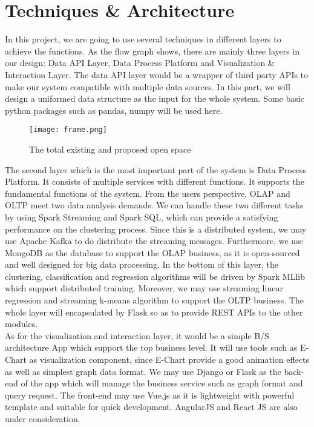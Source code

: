 \documentclass{vgtc}                          %
\begin{document}
\section{Techniques \& Architecture}

\noindent In this project, we are going to use several techniques in different layers to achieve the functions. As the flow graph shows, there are mainly three layers in our design: Data API Layer, Data Process Platform and Visualization & Interaction Layer. The data API layer would be a wrapper of third party APIs to make our system compatible with multiple data sources. In this part, we will design a uniformed data structure as the input for the whole system. Some basic python packages such as pandas, numpy will be used here.\\

\begin{figure}[h]%
	\centering  %
	\texttt{[image: frame.png]} %
	\caption{The total existing and proposed open space}  %
\end{figure}

\noindent The second layer which is the most important part of the system is Data Process Platform. It consists of multiple services with different functions. It supports the fundamental functions of the system. From the users perspective, OLAP and OLTP meet two data analysis demands. We can handle these two different tasks by using Spark Streaming and Spark SQL, which can provide a satisfying performance on the clustering process. Since this is a distributed system, we may use Apache Kafka to do distribute the streaming messages. Furthermore, we use MongoDB as the database to support the OLAP business, as it is open-sourced and well designed for big data processing. In the bottom of this layer, the clustering, classification and regression algorithms will be driven by Spark MLlib which support distributed training. Moreover, we may use streaming linear regression and streaming k-means algorithm to support the OLTP business. The whole layer will encapsulated by Flask so as to provide REST APIs to the other modules.\\

\noindent As for the visualization and interaction layer, it would be a simple B/S architecture App which support the top business level. It will use tools such as E-Chart as visualization component, since E-Chart provide a good animation effects as well as simplest graph data format. We may use Django or Flask as the back-end of the app which will manage the business service such as graph format and query request. The front-end may use Vue.js as it is lightweight with powerful template and suitable for quick development. AngularJS and React JS are also under consideration.
\end{document}
